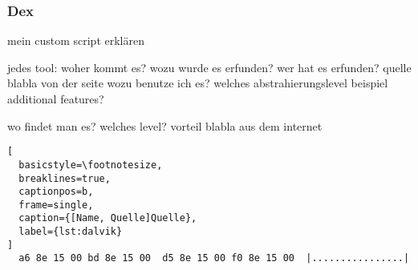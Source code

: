 \subsubsection{Dex}\label{subsubsection:tools-dex}
mein custom script erklären

jedes tool:\newline
woher kommt es?\newline
wozu wurde es erfunden?\newline
wer hat es erfunden? quelle\newline
blabla von der seite\newline
wozu benutze ich es?\newline
welches abstrahierungslevel\newline
beispiel\newline
additional features?\newline

wo findet man es?\newline
welches level?\newline
vorteil\newline
blabla aus dem internet\newline



\begin{lstlisting}[
  basicstyle=\footnotesize,
  breaklines=true,
  captionpos=b,
  frame=single,
  caption={[Name, Quelle]Quelle},
  label={lst:dalvik}
]
  a6 8e 15 00 bd 8e 15 00  d5 8e 15 00 f0 8e 15 00  |................|
\end{lstlisting}
